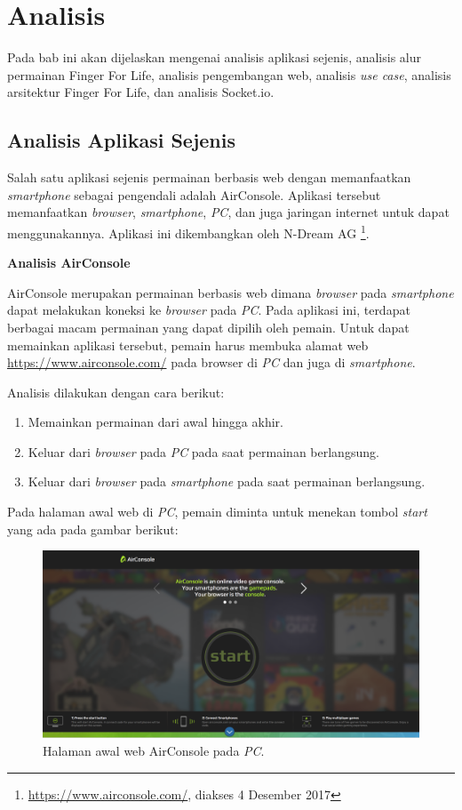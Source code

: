 \chapter{Analisis}
\label{chap:analisis}

Pada bab ini akan dijelaskan mengenai analisis aplikasi sejenis, analisis alur permainan Finger For Life, analisis pengembangan web, analisis \textit{use case}, analisis arsitektur Finger For Life, dan analisis Socket.io.

\section{Analisis Aplikasi Sejenis}
\label{sec:AirConsole}

Salah satu aplikasi sejenis permainan berbasis web dengan memanfaatkan \textit{smartphone} sebagai pengendali adalah AirConsole. Aplikasi tersebut memanfaatkan \textit{browser}, \textit{smartphone}, \textit{PC}, dan juga jaringan internet untuk dapat menggunakannya. Aplikasi ini dikembangkan oleh N-Dream AG \footnote{\url{https://www.airconsole.com/}, diakses 4 Desember 2017}.

\textbf{Analisis AirConsole} 

AirConsole merupakan permainan berbasis web dimana \textit{browser} pada \textit{smartphone} dapat melakukan koneksi ke \textit{browser} pada  \textit{PC}. Pada aplikasi ini, terdapat berbagai macam permainan yang dapat dipilih oleh pemain. Untuk dapat memainkan aplikasi tersebut, pemain harus membuka alamat web \url{https://www.airconsole.com/} pada browser di \textit{PC} dan juga di \textit{smartphone}.

Analisis dilakukan dengan cara berikut:
\begin{enumerate}
	\item Memainkan permainan dari awal hingga akhir.
	\item Keluar dari \textit{browser} pada \textit{PC} pada saat permainan berlangsung.
	\item Keluar dari \textit{browser} pada \textit{smartphone} pada saat permainan berlangsung.
\end{enumerate}
Pada halaman awal web di \textit{PC}, pemain diminta untuk menekan tombol \textit{start} yang ada pada gambar berikut: 

\begin{figure}[H]
	\centering
	\includegraphics[scale=0.2]{Gambar/con1_home1}
	\caption{Halaman awal web AirConsole pada \textit{PC}.}
	\label{fig:16_con1_home1}
\end{figure}


